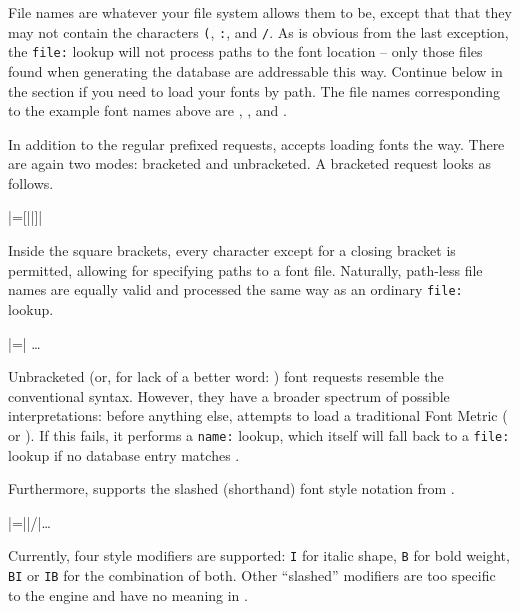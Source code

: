 File names are whatever your file system allows them to be, except
that that they may not contain the characters
	\verb|(|,
	\verb|:|, and
	\verb|/|.
%
As is obvious from the last exception, the \verb|file:| lookup will
not process paths to the font location -- only those
files found when generating the database are addressable this way.
%
Continue below in the \XETEX section if you need to load your fonts
by path.
%
The file names corresponding to the example font names above are
	,
	, and
	.

\endsubsection


In addition to the regular prefixed requests, 
accepts loading fonts the \XETEX way.
%
There are again two modes: bracketed and unbracketed.
A bracketed request looks as follows.

\beginnarrower
  |\font\fontname=[||]|
\endnarrower

\noindent
Inside the square brackets, every character except for a closing
bracket is permitted, allowing for specifying paths to a font file.
%
Naturally, path-less file names are equally valid and processed the
same way as an ordinary \verb|file:| lookup.

\beginnarrower
  |\font\fontname=| \dots
\endnarrower

Unbracketed (or, for lack of a better word: )
font requests resemble the conventional \TEX syntax.
%
However, they have a broader spectrum of possible interpretations:
before anything else,  attempts to load a
traditional \TEX Font Metric ( or ).
%
If this fails, it performs a \verb|name:| lookup, which itself will
fall back to a \verb|file:| lookup if no database entry matches
.

Furthermore,  supports the slashed (shorthand)
font style notation from \XETEX.

\beginnarrower
  |\font\fontname=||/|\dots
\endnarrower

\noindent
Currently, four style modifiers are supported:
  \verb|I| for italic shape,
  \verb|B| for bold   weight,
  \verb|BI| or \verb|IB| for the combination of both.
%
Other “slashed” modifiers are too specific to the \XETEX engine and
have no meaning in \LUATEX.

